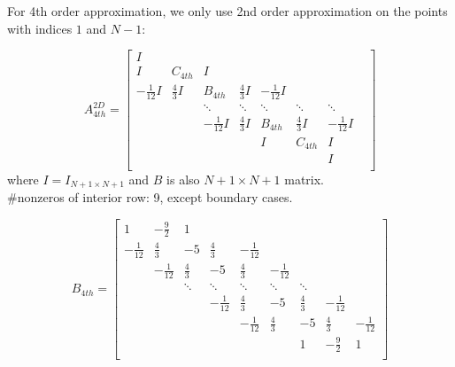 \documentclass[a4paper]{article}
\begin{document}
For 4th order approximation, we only use 2nd order approximation on the points with indices $1$ and $N-1$:

\[
A_{4th}^{2D}
=
\begin{bmatrix}
    I &  &   &   &  &\\
    I & C_{4th} & I  &   &  &\\
    -\frac{1}{12}I& \frac{4}{3}I & B_{4th} & \frac{4}{3}I & -\frac{1}{12}I \\
     & &\ddots& \ddots & \ddots & \ddots & \ddots& \\
     &&-\frac{1}{12}I& \frac{4}{3}I & B_{4th} & \frac{4}{3}I & -\frac{1}{12}I \\
     & & & &I& C_{4th}  & I& \\
     & & &  & &  & I  \\
\end{bmatrix}
\]
where $I=I_{N+1\times N+1}$ and $B$ is also $N+1 \times N+1$ matrix.\\
\#nonzeros of interior row: 9, except boundary cases.

\[
B_{4th}
=
\begin{bmatrix}
    1 & -\frac{9}{2} &1\\
    -\frac{1}{12}  & \frac{4}{3}  & -5 & \frac{4}{3}  & - \frac{1}{12} & &&\\
     &-\frac{1}{12}  & \frac{4}{3}  & -5 & \frac{4}{3}  & - \frac{1}{12} & &&\\
     && \ddots& \ddots & \ddots & \ddots & \ddots & \\
    &&& -\frac{1}{12}  & \frac{4}{3}  & -5 & \frac{4}{3}  & - \frac{1}{12} \\
    &&&& -\frac{1}{12}  & \frac{4}{3}  & -5 & \frac{4}{3}  & - \frac{1}{12} \\
     &&&& &&1 & -\frac{9}{2} &1\\
\end{bmatrix}
\]
\end{document}
